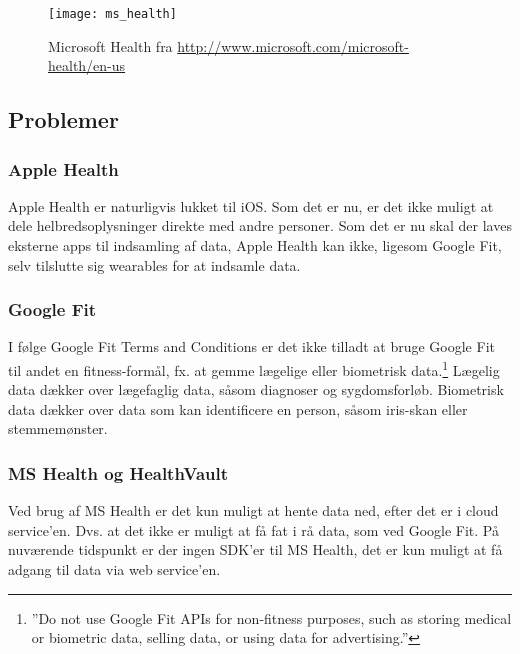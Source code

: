 \begin{figure}
\centering
\texttt{[image: ms\_health]}
\caption{Microsoft Health fra \url{http://www.microsoft.com/microsoft-health/en-us}}
\label{eksisterende_systemer:ms_health_fig}
\end{figure}

\subsection{Problemer}

\subsubsection{Apple Health}
Apple Health er naturligvis lukket til iOS.
Som det er nu, er det ikke muligt at dele helbredsoplysninger direkte med andre personer.
Som det er nu skal der laves eksterne apps til indsamling af data, Apple Health kan ikke, ligesom Google Fit, selv tilslutte sig wearables for at indsamle data.

\subsubsection{Google Fit}
I følge Google Fit Terms and Conditions er det ikke tilladt at bruge Google Fit til andet en fitness-formål, fx. at gemme lægelige eller biometrisk data.\footnote{''Do not use Google Fit APIs for non-fitness purposes, such as storing medical or biometric data, selling data, or using data for advertising.''}
Lægelig data dækker over lægefaglig data, såsom diagnoser og sygdomsforløb.
Biometrisk data dækker over data som kan identificere en person, såsom iris-skan eller stemmemønster.

\subsubsection{MS Health og HealthVault}
Ved brug af MS Health er det kun muligt at hente data ned, efter det er i cloud service'en.
Dvs. at det ikke er muligt at få fat i rå data, som ved Google Fit.
På nuværende tidspunkt er der ingen SDK'er til MS Health, det er kun muligt at få adgang til data via web service'en.
